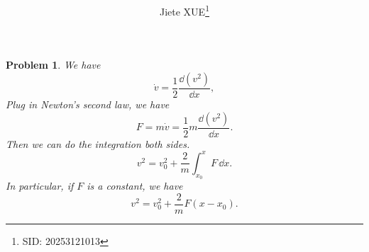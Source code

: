 \documentclass{article}
\title{\textbf{\mytitle}}
\author{Jiete XUE\thanks{SID: 20253121013}}
\date{\mydate}
\theoremstyle{1}
\newtheorem{problem}{Problem}
\begin{document}
\maketitle
\begin{problem}
    We have
    \begin{equation}
        \dot{v}=\frac{1}{2}\frac{\dd(v^2)}{\dd x},
    \end{equation}
    Plug in Newton's second law, we have
    \begin{equation}
        F=m\dot{v}=\frac{1}{2}m\frac{\dd(v^2)}{\dd x}.
    \end{equation}
Then we can do the integration both sides.
\begin{equation}
    v^2=v_0^2+\frac{2}{m}\int_{x_0}^{x}F\,\dd x.
\end{equation}
In particular, if $F$ is a constant, we have
\begin{equation}
    v^2=v_0^2+\frac{2}{m}F(x-x_0).
\end{equation}
\end{problem}
\end{document}
